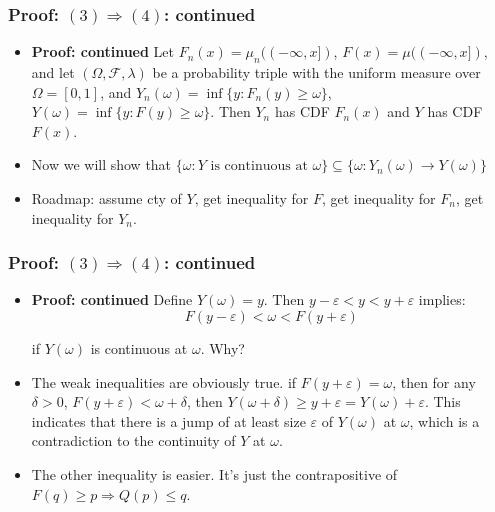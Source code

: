 \documentclass[handout]{beamer}
\begin{document}
\frame
{
  \frametitle{Proof: $(3) \Rightarrow (4)$: continued} 

\begin{itemize}
          
                     
\item<1-> \textbf{Proof: continued} Let $F_n(x)=\mu_n((-\infty, x])$, $F(x)=\mu((-\infty, x])$, and let $(\Omega, \mathcal{F}, \lambda)$ be a probability triple with the uniform measure over $\Omega=[0,1]$, and $Y_n(\omega)=\inf \{y: F_n(y) \geq \omega\}$, $Y(\omega)=\inf \{y: F(y) \geq \omega\}$. Then $Y_n$ has CDF $F_n(x)$ and $Y$ has CDF $F(x)$.  
                     
                     
    \item<2->[-] Now we will show that $\{\omega : Y \text{ is continuous at } \omega\} \subseteq  \{ \omega : Y_n(\omega) \rightarrow Y(\omega)\}$ 
                     
\item<3->[-] Roadmap: assume cty of $Y$, get inequality for $F$, get inequality for $F_n$, get inequality for $Y_n$. 

                                         
\end{itemize}
}





\frame
{
  \frametitle{Proof: $(3) \Rightarrow (4)$: continued} 

\begin{itemize}
          
\item<1-> \textbf{Proof: continued} Define $Y(\omega) = y$. Then $y-\varepsilon<y< y+\varepsilon$ implies:
                                                  $$F(y-\varepsilon)< \omega < F(y+\varepsilon) $$
                         
if $Y(\omega)$ is continuous at $\omega$. Why?
                         
                   
\item<2-> The weak inequalities are obviously true. if $F(y+\varepsilon)=\omega$, then for any $\delta>0$, $F(y+\varepsilon)<\omega+\delta$, then $Y(\omega+\delta) \ge y+\varepsilon=Y(\omega)+\varepsilon$. This indicates that there is a jump of at least size $\varepsilon$ of $Y(\omega)$ at $\omega$, which is a contradiction to the continuity of $Y$ at $\omega$. 
                   
\item<3-> The other inequality is easier. It's just the contrapositive of $F(q)\geq p \Rightarrow Q(p)\leq q $.

                                         
\end{itemize}
}
\end{document}
